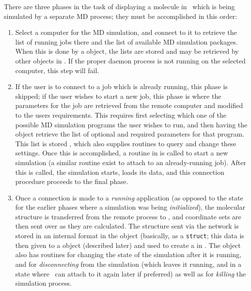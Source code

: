There are three phases in the task of displaying a molecule in \VMD\ which is being simulated by a separate MD process; they must be accomplished in this order:
\begin{enumerate}
  \item Select a computer for the MD simulation, and connect to it to retrieve the list of running jobs there and the list of available MD simulation packages.  When this is done by a  object, the lists are stored and may be retrieved by other objects in \VMD.  If the proper daemon process is not running on the selected computer, this step will fail.
  \item If the user is to connect to a job which is already running, this phase is skipped; if the user wishes to start a new job, this phase is where the parameters for the job are retrieved from the remote computer and modified to the users requirements.  This requires first selecting which one of the possible MD simulation programs the user wishes to run, and then having the  object retrieve the list of optional and required parameters for that program.  This list is stored , which also supplies routines to query and change these settings.  Once this is accomplished, a routine in  is called to start a new simulation (a similar routine exist to attach to an already-running job).  After this is called, the simulation starts, loads its data, and this connection procedure proceeds to the final phase.
  \item Once a connection is made to a {\em running} application (as opposed to the state for the earlier phases where a simulation was being {\em initialized}), the molecular structure is transferred from the remote process to \VMD, and coordinate sets are then sent over as they are calculated.  The structure sent via the network is stored in an internal format in the  object (basically, as a {\tt struct}; this data is then given to a  object (described later) and used to create a  in \VMD.  The  object also has routines for changing the state of the simulation after it is running, and for {\em disconnecting} from the simulation (which leaves it running, and in a state where \VMD\ can attach to it again later if preferred) as well as for {\em killing} the simulation process.
\end{enumerate}

